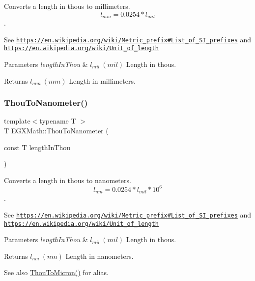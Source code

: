 Converts a length in thous to millimeters. \[ l_{mm}=0.0254 * l_{mil} \]. 

See \href{https://en.wikipedia.org/wiki/Metric_prefix#List_of_SI_prefixes}{\tt https\+://en.\+wikipedia.\+org/wiki/\+Metric\+\_\+prefix\#\+List\+\_\+of\+\_\+\+S\+I\+\_\+prefixes} and \href{https://en.wikipedia.org/wiki/Unit_of_length}{\tt https\+://en.\+wikipedia.\+org/wiki/\+Unit\+\_\+of\+\_\+length} 
\begin{DoxyParams}{Parameters}
{\em length\+In\+Thou} & $ l_{mil}\ (mil)$ Length in thous. \\
\hline
\end{DoxyParams}
\begin{DoxyReturn}{Returns}
$ l_{mm}\ (mm)$ Length in millimeters. 
\end{DoxyReturn}
\mbox{\label{group___e_g_x_math-_conversions-_length_conversions-_imperial-_thou-_s_i_gadc6f45eeae7d4fe8bb993419c96e1860}} 
\subsubsection{\texorpdfstring{Thou\+To\+Nanometer()}{ThouToNanometer()}}
{\footnotesize\ttfamily template$<$typename T $>$ \\
T E\+G\+X\+Math\+::\+Thou\+To\+Nanometer (\begin{DoxyParamCaption}\item[{const T}]{length\+In\+Thou }\end{DoxyParamCaption})}



Converts a length in thous to nanometers. \[ l_{nm}=0.0254 * l_{mil} * 10^{6} \]. 

See \href{https://en.wikipedia.org/wiki/Metric_prefix#List_of_SI_prefixes}{\tt https\+://en.\+wikipedia.\+org/wiki/\+Metric\+\_\+prefix\#\+List\+\_\+of\+\_\+\+S\+I\+\_\+prefixes} and \href{https://en.wikipedia.org/wiki/Unit_of_length}{\tt https\+://en.\+wikipedia.\+org/wiki/\+Unit\+\_\+of\+\_\+length} 
\begin{DoxyParams}{Parameters}
{\em length\+In\+Thou} & $ l_{mil}\ (mil)$ Length in thous. \\
\hline
\end{DoxyParams}
\begin{DoxyReturn}{Returns}
$ l_{nm}\ (nm)$ Length in nanometers. 
\end{DoxyReturn}
\begin{DoxySeeAlso}{See also}
\mbox{\hyperlink{group___e_g_x_math-_conversions-_length_conversions-_imperial-_thou-_non-_s_i_ga7f43c9a1cbb845911bdcbbbe388347a1}{Thou\+To\+Micron()}} for alias. 
\end{DoxySeeAlso}
\mbox{\label{group___e_g_x_math-_conversions-_length_conversions-_imperial-_thou-_s_i_ga14912eb2003dcac47d530dfb90b90761}} 
